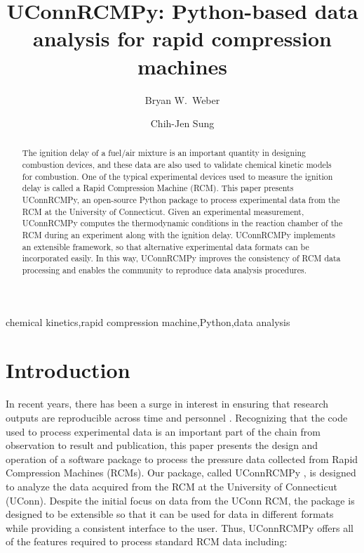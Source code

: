 \documentclass[12pt]{../ussci}
\title{ UConnRCMPy: Python-based data analysis for rapid compression machines }
\author[1*]{Bryan W.\ Weber}
\author[1]{Chih-Jen Sung}
\affil[1]{Department of Mechanical Engineering, University of Connecticut, Storrs,
CT, USA}
\affil[*]{Corresponding Author: \email{bryan.weber@uconn.edu}}
\begin{document}
\maketitle

\begin{abstract} %
    The ignition delay of a fuel/air mixture is an important quantity in
    designing combustion devices, and these data are also used to validate
    chemical kinetic models for combustion. One of the typical experimental
    devices used to measure the ignition delay is called a Rapid Compression
    Machine (RCM). This paper presents UConnRCMPy, an open-source Python package
    to process experimental data from the RCM at the University of Connecticut.
    Given an experimental measurement, UConnRCMPy computes the thermodynamic
    conditions in the reaction chamber of the RCM during an experiment along
    with the ignition delay. UConnRCMPy implements an extensible framework, so
    that alternative experimental data formats can be incorporated easily. In
    this way, UConnRCMPy improves the consistency of RCM data processing and
    enables the community to reproduce data analysis procedures.
\end{abstract}

\begin{keyword}
    chemical kinetics\sep rapid compression machine\sep Python\sep data analysis
\end{keyword}

\section{Introduction}\label{introduction}

In recent years, there has been a surge in interest in ensuring that research
outputs are reproducible across time and personnel \autocite{NatureEds2016}.
Recognizing that the code used to process experimental data is an important part
of the chain from observation to result and publication, this paper presents the
design and operation of a software package to process the pressure data
collected from Rapid Compression Machines (RCMs). Our package, called UConnRCMPy
\autocite{uconnrcmpy}, is designed to analyze the data acquired from the RCM at
the University of Connecticut (UConn). Despite the initial focus on data from
the UConn RCM, the package is designed to be extensible so that it can be used
for data in different formats while providing a consistent interface to the
user. Thus, UConnRCMPy offers all of the features required to process standard
RCM data including:
\end{document}
